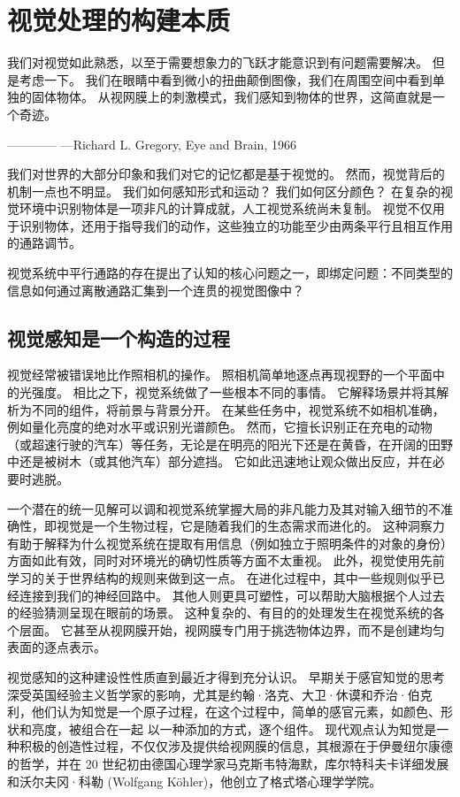 \chapter{视觉处理的构建本质} \label{chap:chap21}
我们对视觉如此熟悉，以至于需要想象力的飞跃才能意识到有问题需要解决。
但是考虑一下。
我们在眼睛中看到微小的扭曲颠倒图像，我们在周围空间中看到单独的固体物体。
从视网膜上的刺激模式，我们感知到物体的世界，这简直就是一个奇迹。

———— —Richard L. Gregory, Eye and Brain, 1966


我们对世界的大部分印象和我们对它的记忆都是基于视觉的。 
然而，视觉背后的机制一点也不明显。 
我们如何感知形式和运动？ 
我们如何区分颜色？ 
在复杂的视觉环境中识别物体是一项非凡的计算成就，人工视觉系统尚未复制。 
视觉不仅用于识别物体，还用于指导我们的动作，这些独立的功能至少由两条平行且相互作用的通路调节。


视觉系统中平行通路的存在提出了认知的核心问题之一，即绑定问题：不同类型的信息如何通过离散通路汇集到一个连贯的视觉图像中？


\section{视觉感知是一个构造的过程}
视觉经常被错误地比作照相机的操作。 
照相机简单地逐点再现视野的一个平面中的光强度。 
相比之下，视觉系统做了一些根本不同的事情。 
它解释场景并将其解析为不同的组件，将前景与背景分开。 
在某些任务中，视觉系统不如相机准确，例如量化亮度的绝对水平或识别光谱颜色。 
然而，它擅长识别正在充电的动物（或超速行驶的汽车）等任务，无论是在明亮的阳光下还是在黄昏，在开阔的田野中还是被树木（或其他汽车）部分遮挡。 
它如此迅速地让观众做出反应，并在必要时逃脱。


一个潜在的统一见解可以调和视觉系统掌握大局的非凡能力及其对输入细节的不准确性，即视觉是一个生物过程，它是随着我们的生态需求而进化的。 
这种洞察力有助于解释为什么视觉系统在提取有用信息（例如独立于照明条件的对象的身份）方面如此有效，同时对环境光的确切性质等方面不太重视。 
此外，视觉使用先前学习的关于世界结构的规则来做到这一点。 
在进化过程中，其中一些规则似乎已经连接到我们的神经回路中。 
其他人则更具可塑性，可以帮助大脑根据个人过去的经验猜测呈现在眼前的场景。
这种复杂的、有目的的处理发生在视觉系统的各个层面。 
它甚至从视网膜开始，视网膜专门用于挑选物体边界，而不是创建均匀表面的逐点表示。


视觉感知的这种建设性性质直到最近才得到充分认识。 
早期关于感官知觉的思考深受英国经验主义哲学家的影响，尤其是约翰·洛克、大卫·休谟和乔治·伯克利，他们认为知觉是一个原子过程，在这个过程中，简单的感官元素，如颜色、形状和亮度，被组合在一起 以一种添加的方式，逐个组件。
现代观点认为知觉是一种积极的创造性过程，不仅仅涉及提供给视网膜的信息，其根源在于伊曼纽尔康德的哲学，并在 20 世纪初由德国心理学家马克斯韦特海默，库尔特科夫卡详细发展 和沃尔夫冈·科勒 (Wolfgang Köhler)，他创立了格式塔心理学学院。



